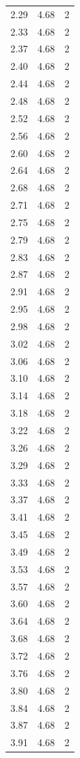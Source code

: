 \begin{longtable}{lrr}
  2.29 & 4.68 & 2 \\
  2.33 & 4.68 & 2 \\
  2.37 & 4.68 & 2 \\
  2.40 & 4.68 & 2 \\
  2.44 & 4.68 & 2 \\
  2.48 & 4.68 & 2 \\
  2.52 & 4.68 & 2 \\
  2.56 & 4.68 & 2 \\
  2.60 & 4.68 & 2 \\
  2.64 & 4.68 & 2 \\
  2.68 & 4.68 & 2 \\
  2.71 & 4.68 & 2 \\
  2.75 & 4.68 & 2 \\
  2.79 & 4.68 & 2 \\
  2.83 & 4.68 & 2 \\
  2.87 & 4.68 & 2 \\
  2.91 & 4.68 & 2 \\
  2.95 & 4.68 & 2 \\
  2.98 & 4.68 & 2 \\
  3.02 & 4.68 & 2 \\
  3.06 & 4.68 & 2 \\
  3.10 & 4.68 & 2 \\
  3.14 & 4.68 & 2 \\
  3.18 & 4.68 & 2 \\
  3.22 & 4.68 & 2 \\
  3.26 & 4.68 & 2 \\
  3.29 & 4.68 & 2 \\
  3.33 & 4.68 & 2 \\
  3.37 & 4.68 & 2 \\
  3.41 & 4.68 & 2 \\
  3.45 & 4.68 & 2 \\
  3.49 & 4.68 & 2 \\
  3.53 & 4.68 & 2 \\
  3.57 & 4.68 & 2 \\
  3.60 & 4.68 & 2 \\
  3.64 & 4.68 & 2 \\
  3.68 & 4.68 & 2 \\
  3.72 & 4.68 & 2 \\
  3.76 & 4.68 & 2 \\
  3.80 & 4.68 & 2 \\
  3.84 & 4.68 & 2 \\
  3.87 & 4.68 & 2 \\
  3.91 & 4.68 & 2 \\

\end{longtable}
